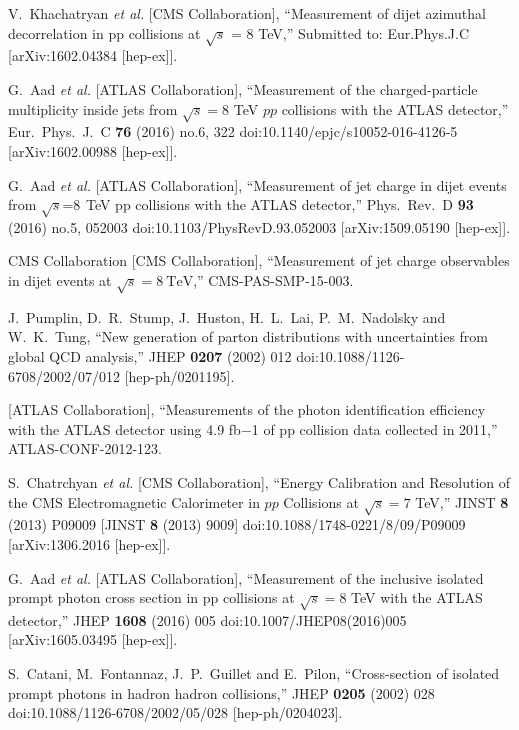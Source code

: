 \documentclass{PoS}
\begin{document}
\begin{thebibliography}{99}
  V.~Khachatryan {\it et al.} [CMS Collaboration],
  ``Measurement of dijet azimuthal decorrelation in pp collisions at $\sqrt{s}$ = 8 TeV,''
  Submitted to: Eur.Phys.J.C
  [arXiv:1602.04384 [hep-ex]].

  G.~Aad {\it et al.} [ATLAS Collaboration],
  ``Measurement of the charged-particle multiplicity inside jets from $\sqrt{s}=8$ TeV $pp$ collisions with the ATLAS detector,''
  Eur.\ Phys.\ J.\ C {\bf 76} (2016) no.6,  322
  doi:10.1140/epjc/s10052-016-4126-5
  [arXiv:1602.00988 [hep-ex]].

  G.~Aad {\it et al.} [ATLAS Collaboration],
  ``Measurement of jet charge in dijet events from $\sqrt{s}$=8  TeV pp collisions with the ATLAS detector,''
  Phys.\ Rev.\ D {\bf 93} (2016) no.5,  052003
  doi:10.1103/PhysRevD.93.052003
  [arXiv:1509.05190 [hep-ex]].

  CMS Collaboration [CMS Collaboration],
  ``Measurement of jet charge observables in dijet events at $\sqrt{s}=8~\mathrm{TeV}$,''
  CMS-PAS-SMP-15-003.

  J.~Pumplin, D.~R.~Stump, J.~Huston, H.~L.~Lai, P.~M.~Nadolsky and W.~K.~Tung,
  ``New generation of parton distributions with uncertainties from global QCD analysis,''
  JHEP {\bf 0207} (2002) 012
  doi:10.1088/1126-6708/2002/07/012
  [hep-ph/0201195].

  [ATLAS Collaboration],
  ``Measurements of the photon identification efficiency with the ATLAS detector using 4.9 fb−1 of pp collision data collected in 2011,''
  ATLAS-CONF-2012-123.

  S.~Chatrchyan {\it et al.} [CMS Collaboration],
  ``Energy Calibration and Resolution of the CMS Electromagnetic Calorimeter in $pp$ Collisions at $\sqrt{s} = 7$ TeV,''
  JINST {\bf 8} (2013) P09009
   [JINST {\bf 8} (2013) 9009]
  doi:10.1088/1748-0221/8/09/P09009
  [arXiv:1306.2016 [hep-ex]].

  G.~Aad {\it et al.} [ATLAS Collaboration],
  ``Measurement of the inclusive isolated prompt photon cross section in pp collisions at $ \sqrt{s}=8 $ TeV with the ATLAS detector,''
  JHEP {\bf 1608} (2016) 005
  doi:10.1007/JHEP08(2016)005
  [arXiv:1605.03495 [hep-ex]].

  S.~Catani, M.~Fontannaz, J.~P.~Guillet and E.~Pilon,
  ``Cross-section of isolated prompt photons in hadron hadron collisions,''
  JHEP {\bf 0205} (2002) 028
  doi:10.1088/1126-6708/2002/05/028
  [hep-ph/0204023].


\end{thebibliography}
\end{document}
